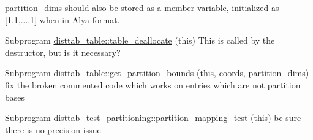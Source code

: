 \begin{DoxyRefList}
partition\+\_\+dims should also be stored as a member variable, initialized as \mbox{[}1,1,...,1\mbox{]} when in Alya format.  
\item[Subprogram \mbox{\hyperlink{namespacedisttab__table_aa09b941e14a6f94cd56d6531a3abc1cf}{disttab\+\_\+table\+::table\+\_\+deallocate}} (this)]\label{todo__todo000006}%
%
This is called by the destructor, but is it necessary?  
\item[Subprogram \mbox{\hyperlink{namespacedisttab__table_afe75e53b5186b175b6e164ef565a5d7e}{disttab\+\_\+table\+::get\+\_\+partition\+\_\+bounds}} (this, coords, partition\+\_\+dims)]\label{todo__todo000007}%
%
fix the broken commented code which works on entries which are not partition bases  
\item[Subprogram \mbox{\hyperlink{namespacedisttab__test__partitioning_a5a71fcde2c7b22ebfad7d1ce5b142407}{disttab\+\_\+test\+\_\+partitioning\+::partition\+\_\+mapping\+\_\+test}} (this)]\label{todo__todo000008}%
%
be sure there is no precision issue 
\end{DoxyRefList}